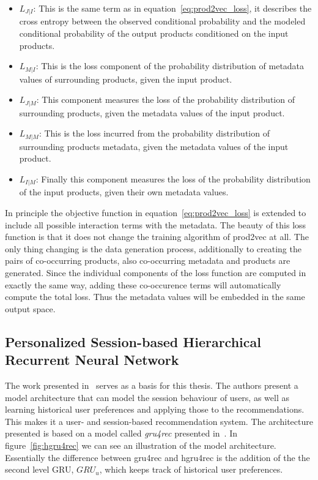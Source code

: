 \begin{itemize}
    \item $L_{J|I}$: This is the same term as in equation~\ref{eq:prod2vec_loss}, it describes the cross entropy between the observed conditional probability and the modeled conditional probability of the output products conditioned on the input products.
    \item $L_{M|I}$: This is the loss component of the probability distribution of metadata values of surrounding products, given the input product.
    \item $L_{J|M}$: This component measures the loss of the probability distribution of surrounding products, given the metadata values of the input product.
    \item $L_{M|M}$: This is the loss incurred from the probability distribution of surrounding products metadata, given the metadata values of the input product.
    \item $L_{I|M}$: Finally this component measures the loss of the probability distribution of the input products, given their own metadata values.
\end{itemize}
In principle the objective function in equation~\ref{eq:prod2vec_loss} is extended to include all possible interaction terms with the metadata.
The beauty of this loss function is that it does not change the training algorithm of prod2vec at all.
The only thing changing is the data generation process, additionally to creating the pairs of co-occurring products, also co-occurring metadata and products are generated.
Since the individual components of the loss function are computed in exactly the same way, adding these co-occurence terms will automatically compute the total loss.
Thus the metadata values will be embedded in the same output space.
\subsection{Personalized Session-based Hierarchical Recurrent Neural Network}\label{sec:hgru4rec}
The work presented in~\cite{hierarchical} serves as a basis for this thesis.
The authors present a model architecture that can model the session behaviour of users, as well as learning historical user preferences and applying those to the recommendations.
This makes it a user- and session-based recommendation system.
The architecture presented is based on a model called \emph{gru4rec} presented in~\cite{gru4rec}.
In figure~\ref{fig:hgru4rec} we can see an illustration of the model architecture.
Essentially the difference between gru4rec and hgru4rec is the addition of the the second level GRU, $GRU_{u}$, which keeps track of historical user preferences.

